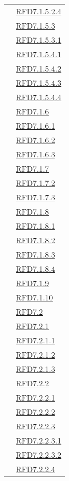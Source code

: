 \begin{longtable}{|>{\centering}m{5cm}|m{5cm}<{\centering}|}
& \hyperlink{RFD7.1.5.2.4}{RFD7.1.5.2.4}\\
& \hyperlink{RFD7.1.5.3}{RFD7.1.5.3}\\
& \hyperlink{RFD7.1.5.3.1}{RFD7.1.5.3.1}\\
& \hyperlink{RFD7.1.5.4.1}{RFD7.1.5.4.1}\\
& \hyperlink{RFD7.1.5.4.2}{RFD7.1.5.4.2}\\
& \hyperlink{RFD7.1.5.4.3}{RFD7.1.5.4.3}\\
& \hyperlink{RFD7.1.5.4.4}{RFD7.1.5.4.4}\\
& \hyperlink{RFD7.1.6}{RFD7.1.6}\\
& \hyperlink{RFD7.1.6.1}{RFD7.1.6.1}\\
& \hyperlink{RFD7.1.6.2}{RFD7.1.6.2}\\
& \hyperlink{RFD7.1.6.3}{RFD7.1.6.3}\\
& \hyperlink{RFD7.1.7}{RFD7.1.7}\\
& \hyperlink{RFD7.1.7.2}{RFD7.1.7.2}\\
& \hyperlink{RFD7.1.7.3}{RFD7.1.7.3}\\
& \hyperlink{RFD7.1.8}{RFD7.1.8}\\
& \hyperlink{RFD7.1.8.1}{RFD7.1.8.1}\\
& \hyperlink{RFD7.1.8.2}{RFD7.1.8.2}\\
& \hyperlink{RFD7.1.8.3}{RFD7.1.8.3}\\
& \hyperlink{RFD7.1.8.4}{RFD7.1.8.4}\\
& \hyperlink{RFD7.1.9}{RFD7.1.9}\\
& \hyperlink{RFD7.1.10}{RFD7.1.10}\\
& \hyperlink{RFD7.2}{RFD7.2}\\
& \hyperlink{RFD7.2.1}{RFD7.2.1}\\
& \hyperlink{RFD7.2.1.1}{RFD7.2.1.1}\\
& \hyperlink{RFD7.2.1.2}{RFD7.2.1.2}\\
& \hyperlink{RFD7.2.1.3}{RFD7.2.1.3}\\
& \hyperlink{RFD7.2.2}{RFD7.2.2}\\
& \hyperlink{RFD7.2.2.1}{RFD7.2.2.1}\\
& \hyperlink{RFD7.2.2.2}{RFD7.2.2.2}\\
& \hyperlink{RFD7.2.2.3}{RFD7.2.2.3}\\
& \hyperlink{RFD7.2.2.3.1}{RFD7.2.2.3.1}\\
& \hyperlink{RFD7.2.2.3.2}{RFD7.2.2.3.2}\\
& \hyperlink{RFD7.2.2.4}{RFD7.2.2.4}\\

\end{longtable}

